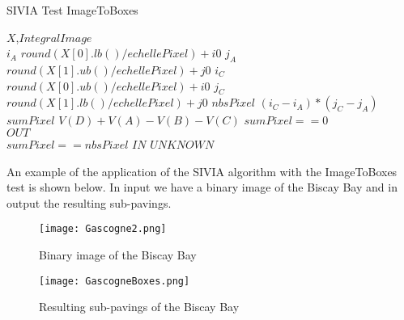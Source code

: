 \begin{algorithm}[H]
\caption{SIVIA Test ImageToBoxes}
\label{alg:one_boat_alg}
\begin{algorithmic}[1]
\REQUIRE $X$,$IntegralImage$\\
$i_A$ \gets \textnormal{$round(X[0].lb()/echellePixel) + i0$}
$j_A$ \gets \textnormal{$round(X[1].ub()/echellePixel) + j0$}
$i_C$ \gets \textnormal{$round(X[0].ub()/echellePixel) + i0$}
$j_C$ \gets \textnormal{$round(X[1].lb()/echellePixel) + j0$}
$nbsPixel$ \gets \textnormal{$(i_C - i_A) * (j_C - j_A)$}
$sumPixel$ \gets \textnormal{$V(D) + V(A) - V(B) - V(C)$}
\IF \textnormal{$sumPixel == 0$}\\
\RETURN \textnormal{$OUT$}\\
\ELSIF \textnormal{$sumPixel == nbsPixel$} 
\RETURN \textnormal{$IN$}
\ELSE
\RETURN \textnormal{$UNKNOWN$}
\ENDIF
\end{algorithmic}
\end{algorithm}

\vspace{1cm}
An example of the application of the SIVIA algorithm with the ImageToBoxes test is shown below. In input we have a binary image of the Biscay Bay and in output the resulting sub-pavings.
\begin{figure}[H]
\centering
    \begin{minipage}[b]{0.4\textwidth}
    \texttt{[image: Gascogne2.png]}
	\caption{Binary image of the Biscay Bay } 
	\label{fig: Biscay Bay}
    \end{minipage}
    \begin{minipage}[b]{0.4\textwidth}
    \texttt{[image: GascogneBoxes.png]} 
	\caption{Resulting sub-pavings of the Biscay Bay } 
	\label{fig: Sub-pavings of the Biscay Bay}
    \end{minipage}
\end{figure}

